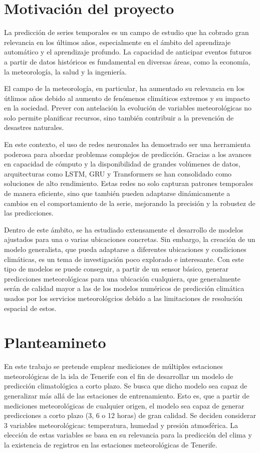 \section{Motivación del proyecto}
La predicción de series temporales es un campo de estudio que ha cobrado gran relevancia en los últimos años, especialmente en el ámbito del aprendizaje automático y el aprendizaje profundo. 
La capacidad de anticipar eventos futuros a partir de datos históricos es fundamental en diversas áreas, como la economía, la meteorología, la salud y la ingeniería. 

El campo de la meteorología, en particular, ha aumentado su relevancia en los útlimos años debido al aumento de fenómenos climáticos extremos y su impacto en la sociedad. 
Prever con antelación la evolución de variables meteorológicas no solo permite planificar recursos, sino también contribuir a la prevención de desastres naturales.

En este contexto, el uso de redes neuronales ha demostrado ser una herramienta poderosa para abordar problemas complejos de predicción.
Gracias a los avances en capacidad de cómputo y la disponibilidad de grandes volúmenes de datos, arquitecturas como LSTM, GRU y Transformers se han consolidado como soluciones de alto rendimiento. 
Estas redes no solo capturan patrones temporales de manera eficiente, sino que también pueden adaptarse dinámicamente a cambios en el comportamiento de la serie, mejorando la precisión y la robustez de las predicciones.

Dentro de este ámbito, se ha estudiado extensamente el desarrollo de modelos ajustados para una o varias ubicaciones concretas. Sin embargo, la creación de un modelo generalista,
que pueda adaptarse a diferentes ubicaciones y condiciones climáticas, es un tema de investigación poco explorado e interesante. Con este tipo de modelos se puede 
conseguir, a partir de un sensor básico, generar predicciones meteorológicas para una ubicación cualquiera, que generalmente serán de calidad mayor a las de los modelos numéricos de predicción 
climática usados por los servicios meteorológcios debido a las limitaciones de resolución espacial de estos.

\section{Planteamineto}
En este trabajo se pretende emplear mediciones de múltiples estaciones meteorológicas de la isla de Tenerife con el fin de desarrollar un modelo de predicción climatológica a corto plazo.
Se busca que dicho modelo sea capaz de generalizar más allá de las estaciones de entrenamiento. Esto es, que a partir de mediciones meteorológicas de cualquier origen, el modelo sea capaz de 
generar predicciones a corto plazo (3, 6 o 12 horas) de gran calidad.
Se deciden considerar 3 variables meteorológicas: temperatura, humedad y presión atmosférica.
La elección de estas variables se basa en su relevancia para la predicción del clima y la existencia de registros en las estaciones meteorológicas de Tenerife.

